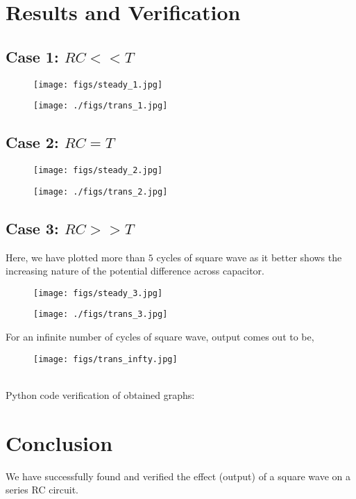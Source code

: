 \documentclass[a4paper,12pt]{article}
\begin{document}
\section*{Results and Verification}
\subsection*{Case 1: \(RC << T\)}
\begin{figure*}[h!]
	\hspace{50pt}
	\begin{subfigure}[b]{10pt}
	\texttt{[image: figs/steady\_1.jpg]}
	\end{subfigure}
	\hspace{135pt}
	\begin{subfigure}[b]{10pt}
	\texttt{[image: ./figs/trans\_1.jpg]}
	\end{subfigure}
\end{figure*}
\subsection*{Case 2: \(RC = T\)}
\begin{figure*}[h!]
	\hspace{50pt}
	\begin{subfigure}[b]{10pt}
	\texttt{[image: figs/steady\_2.jpg]}
	\end{subfigure}
	\hspace{135pt}
	\begin{subfigure}[b]{10pt}
	\texttt{[image: ./figs/trans\_2.jpg]}
	\end{subfigure}
\end{figure*}
\subsection*{Case 3: \(RC >> T\)}
Here, we have plotted more than $5$ cycles of square wave as it better shows the increasing nature of the potential difference across capacitor. 
\pagebreak
\begin{figure*}[h!]
	\hspace{50pt}
	\begin{subfigure}[b]{10pt}
	\texttt{[image: figs/steady\_3.jpg]}
	\end{subfigure}
	\hspace{135pt}
	\begin{subfigure}[b]{10pt}
	\texttt{[image: ./figs/trans\_3.jpg]}
	\end{subfigure}
\end{figure*}
For an infinite number of cycles of square wave, output comes out to be,
\begin{figure}[h!]
  \centering
  \texttt{[image: figs/trans\_infty.jpg]}
  \label{label}
\end{figure}\\
Python code verification of obtained graphs:\\

\section*{Conclusion}
We have successfully found and verified the effect (output) of a square wave on a series RC circuit.
\end{document}
